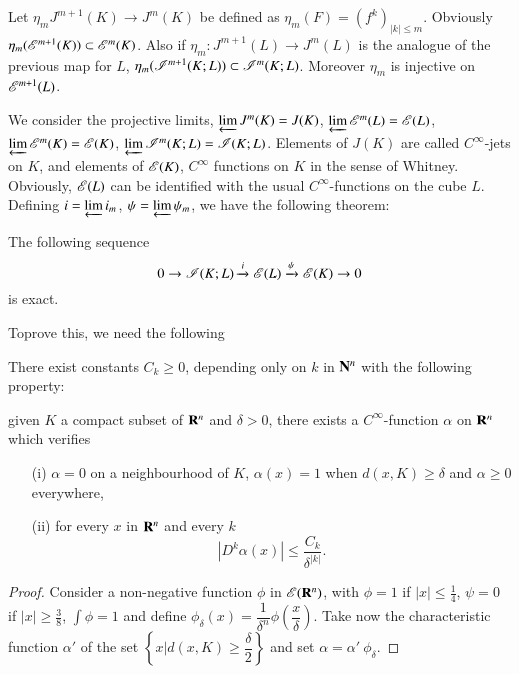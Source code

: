 Let $\eta_{m}J^{m+1}(K)\to J^{m}(K)$ be defined as $\eta_{m}(F)=(f^{k})_{|k|\leq m}$. Obviously $\eta_{m}(\mathscr{E}^{m+1}(K))\subset \mathscr{E}^{m}(K)$. Also if $\eta_{m}:J^{m+1}(L)\to J^{m}(L)$ is the analogue of the previous map for $L$, $\eta_{m}(\mathscr{I}^{m+1}(K;L))\subset \mathscr{I}^{m}(K;L)$. Moreover $\eta_{m}$ is injective on $\mathscr{E}^{m+1}(L)$.

We consider the projective limits, $\varprojlim J^{m}(K)=J(K)$, $\varprojlim \mathscr{E}^{m}(L)=\mathscr{E}(L)$, $\varprojlim\mathscr{E}^{m}(K)=\mathscr{E}(K)$, $\varprojlim\mathscr{I}^{m}(K;L)=\mathscr{I}(K;L)$. Elements of $J(K)$ are called $C^{\infty}$-jets on $K$, and elements of $\mathscr{E}(K)$, $C^{\infty}$ functions on $K$ in the sense of Whitney. Obviously, $\mathscr{E}(L)$ can be identified with the usual $C^{\infty}$-functions on the cube $L$. Defining $i=\varprojlim i_{m}$, $\psi=\varprojlim \psi_{m}$, we have the following theorem:

\begin{theorem}\label{chap1-thm4.1}
The following sequence
$$
0\to \mathscr{I}(K;L)\xrightarrow{i}\mathscr{E}(L)\xrightarrow{\psi}\mathscr{E}(K)\to 0
$$
is exact.
\end{theorem}

To\pageoriginale prove this, we need the following

\begin{lemma}\label{chap1-lem4.2}
There exist constants $C_{k}\geq 0$, depending only on $k$ in $\mathbf{N}^{n}$ with the following property:

given $K$ a compact subset of $\mathbf{R}^{n}$ and $\delta>0$, there exists a $C^{\infty}$-function $\alpha$ on $\mathbf{R}^{n}$ which verifies
\begin{itemize}
\item[\rm(i)] $\alpha=0$ on a neighbourhood of $K$, $\alpha(x)=1$ when $d(x,K)\geq \delta$ and $\alpha\geq 0$ everywhere,

\item[\rm(ii)] for every $x$ in $\mathbf{R}^{n}$ and every $k$
$$
|D^{k}\alpha(x)|\leq \dfrac{C_{k}}{\delta^{|k|}}.
$$
\end{itemize}
\end{lemma}

\begin{proof}
Consider a non-negative function $\phi$ in $\mathscr{E}(\mathbf{R}^{n})$, with $\phi=1$ if $|x|\leq \frac{1}{4}$, $\psi=0$ if $|x|\geq \frac{3}{8}$, $\int\phi=1$ and define $\phi_{\delta}(x)=\dfrac{1}{\delta^{n}}\phi\left(\dfrac{x}{\delta}\right)$. Take now the characteristic function $\alpha'$ of the set $\left\{x|d(x,K)\geq \dfrac{\delta}{2}\right\}$ and set $\alpha=\alpha' \ \phi_{\delta}$.
\end{proof}

